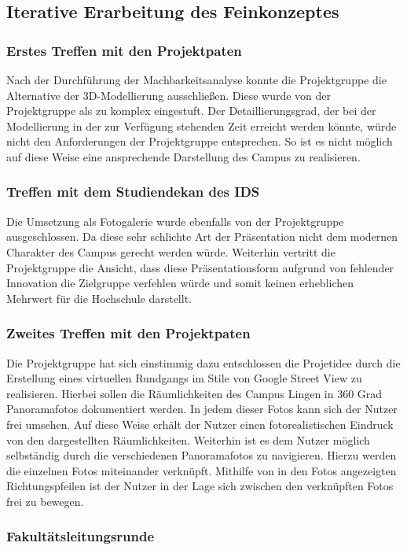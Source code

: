 \subsection{Iterative Erarbeitung des Feinkonzeptes}
\label{sec:ErarbeitungFeinkonzept}



\subsubsection*{Erstes Treffen mit den Projektpaten}
\label{sec:Treffen1}

Nach der Durchführung der Machbarkeitsanalyse konnte die Projektgruppe die
Alternative der 3D-Modellierung ausschließen. Diese wurde von der Projektgruppe
als zu komplex eingestuft. Der Detaillierungsgrad, der bei der Modellierung in
der zur Verfügung stehenden Zeit erreicht werden könnte, würde nicht den
Anforderungen der Projektgruppe entsprechen. So ist es nicht möglich auf diese
Weise eine ansprechende Darstellung des Campus zu realisieren. 

\subsubsection*{Treffen mit dem Studiendekan des IDS}
\label{sec:Treffen2}

Die Umsetzung als Fotogalerie wurde ebenfalls von der Projektgruppe 
ausgeschlossen. Da diese sehr schlichte Art der Präsentation nicht dem modernen
Charakter des Campus gerecht werden würde. Weiterhin vertritt die Projektgruppe
die Ansicht, dass diese Präsentationsform aufgrund von fehlender Innovation die
Zielgruppe verfehlen würde und somit keinen erheblichen Mehrwert für die
Hochschule darstellt.

\subsubsection*{Zweites Treffen mit den Projektpaten}
\label{sec:Treffen3}

Die Projektgruppe hat sich einstimmig dazu entschlossen die Projetidee durch die
Erstellung eines virtuellen Rundgangs im Stile von Google Street View zu
realisieren. Hierbei sollen die Räumlichkeiten des Campus Lingen in 360 Grad
Panoramafotos dokumentiert werden. In jedem dieser Fotos kann sich der Nutzer
frei umsehen. Auf diese Weise erhält der Nutzer einen fotorealistischen Eindruck
von den dargestellten Räumlichkeiten. Weiterhin ist es dem Nutzer möglich
selbständig durch die verschiedenen Panoramafotos zu navigieren. Hierzu werden
die einzelnen Fotos miteinander verknüpft. Mithilfe von in den Fotos
angezeigten Richtungspfeilen ist der Nutzer in der Lage sich zwischen
den verknüpften Fotos frei zu bewegen.

\subsubsection*{Fakultätsleitungsrunde}
\label{sec:Treffen4}